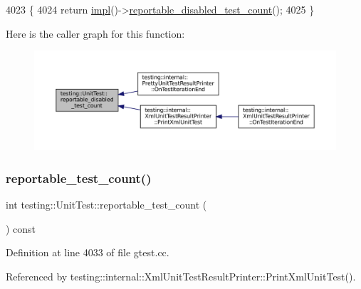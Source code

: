 \begin{DoxyCode}
4023                                                    \{
4024   \textcolor{keywordflow}{return} \hyperlink{classtesting_1_1UnitTest_a4df5d11a58affb337d7fa62eaa07690e}{impl}()->\hyperlink{classtesting_1_1internal_1_1UnitTestImpl_a04827d118a329af68a1de2d6b93eb4e5}{reportable\_disabled\_test\_count}();
4025 \}
\end{DoxyCode}
Here is the caller graph for this function\+:
\nopagebreak
\begin{figure}[H]
\begin{center}
\leavevmode
\includegraphics[width=350pt]{classtesting_1_1UnitTest_a2a2835db178d5c8569507db9f0a3d54f_icgraph}
\end{center}
\end{figure}
\mbox{\label{classtesting_1_1UnitTest_a449d0e0350ef146040cd37679c005248}} 
\subsubsection{\texorpdfstring{reportable\+\_\+test\+\_\+count()}{reportable\_test\_count()}}
{\footnotesize\ttfamily int testing\+::\+Unit\+Test\+::reportable\+\_\+test\+\_\+count (\begin{DoxyParamCaption}{ }\end{DoxyParamCaption}) const}



Definition at line 4033 of file gtest.\+cc.



Referenced by testing\+::internal\+::\+Xml\+Unit\+Test\+Result\+Printer\+::\+Print\+Xml\+Unit\+Test().


